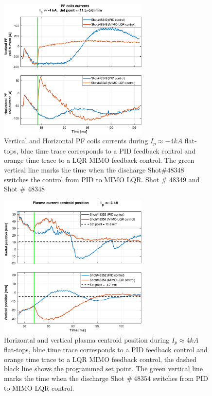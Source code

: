 \begin{figure}
	\centering
	\includegraphics[width=0.67\textwidth]{Chp5/PIDvsMIMO_349_348_curr_2.eps}
	\caption{ Vertical and Horizontal PF coils currents during  $I_p\approx -4kA$  flat-tops, blue time trace corresponds to a PID feedback control and orange time trace to a LQR MIMO feedback control. The green vertical line marks the time  when the  discharge Shot$\# 48348$ switches the control from PID to MIMO LQR. Shot $\#$ 48349 and Shot $\#$ 48348}
\end{figure}


\begin{figure}
	\centering
	\includegraphics[width=0.67\textwidth]{Chp5/PIDvsMIMO_352_354_2.eps}
	\caption{Horizontal and vertical plasma centroid position during  $I_p\approx 4kA$  flat-tops, blue time trace corresponds to a PID feedback control and orange time trace to a LQR MIMO feedback control, the dashed black line shows the programmed set point. The green vertical line marks the time  when the  discharge Shot $\# ~48354$ switches  from PID to MIMO LQR control.}
\end{figure}

